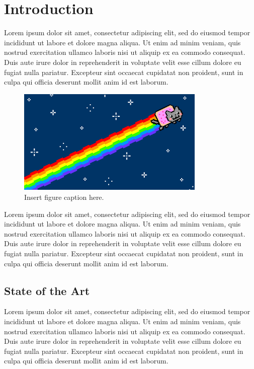 \chapter{Introduction}
\label{ch:Introduction}

Lorem ipsum dolor sit amet, consectetur adipiscing elit, sed do eiusmod tempor incididunt ut labore et dolore magna aliqua. Ut enim ad minim veniam, quis nostrud exercitation ullamco laboris nisi ut aliquip ex ea commodo consequat. Duis aute irure dolor in reprehenderit in voluptate velit esse cillum dolore eu fugiat nulla pariatur. Excepteur sint occaecat cupidatat non proident, sunt in culpa qui officia deserunt mollit anim id est laborum.


\begin{figure}[!htbp]
	\centering
	\includegraphics[width=0.8\textwidth]{figures/Nyan_Cat_Wide.jpg} 
	\caption[This is a nyan cat caption]{
		Insert figure caption here.
	}
	\label{fig:nyan-cat-figure}
\end{figure}\FloatBarrier

Lorem ipsum dolor sit amet, consectetur adipiscing elit, sed do eiusmod tempor incididunt ut labore et dolore magna aliqua. Ut enim ad minim veniam, quis nostrud exercitation ullamco laboris nisi ut aliquip ex ea commodo consequat. Duis aute irure dolor in reprehenderit in voluptate velit esse cillum dolore eu fugiat nulla pariatur. Excepteur sint occaecat cupidatat non proident, sunt in culpa qui officia deserunt mollit anim id est laborum.

\section{State of the Art}
\label{StateOfTheArt}

Lorem ipsum dolor sit amet, consectetur adipiscing elit, sed do eiusmod tempor incididunt ut labore et dolore magna aliqua. Ut enim ad minim veniam, quis nostrud exercitation ullamco laboris nisi ut aliquip ex ea commodo consequat. Duis aute irure dolor in reprehenderit in voluptate velit esse cillum dolore eu fugiat nulla pariatur. Excepteur sint occaecat cupidatat non proident, sunt in culpa qui officia deserunt mollit anim id est laborum.


